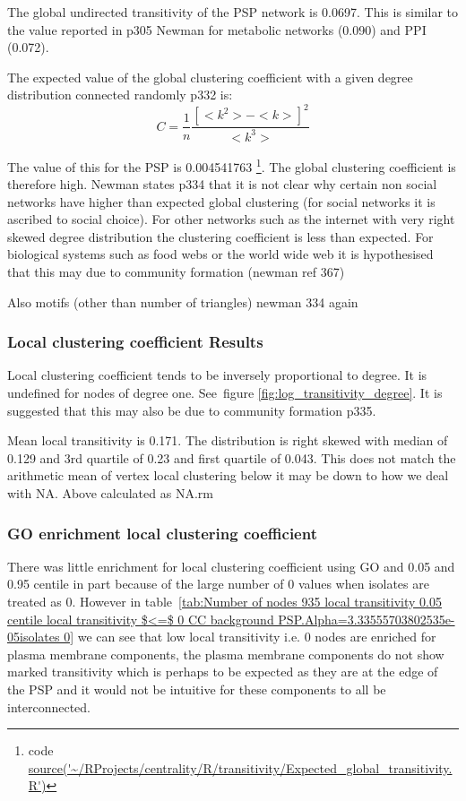 The global undirected transitivity of the PSP network is 0.0697. This is similar to the value reported in p305 Newman \cite{newman2018networks} for metabolic networks (0.090) and PPI (0.072).

The expected value of the global clustering coefficient with a given degree distribution connected randomly \cite{newman2018networks} p332 is:
\begin{equation}
    C=\frac{1}{n}\frac{[<k^2> - <k>]^2}{<k^3>}
\end{equation}

The value of this for the PSP is 0.004541763 \footnote{code \url{source('~/RProjects/centrality/R/transitivity/Expected_global_transitivity.R')}}. The global clustering coefficient is therefore high. Newman states p334 \cite{newman2018networks} that it is not clear why certain non social networks have higher than expected global clustering (for social networks it is ascribed to social choice). For other networks such as the internet with very right skewed degree distribution the clustering coefficient is less than expected. For biological systems such as food webs or the world wide web it is hypothesised that this may due to community formation (newman ref 367)

Also motifs (other than number of triangles) newman 334 again

\subsubsection{Local clustering coefficient Results}
Local clustering coefficient tends to be inversely proportional to degree. It is undefined for nodes of degree one. See~figure \ref{fig:log_transitivity_degree}. It is suggested that this may also be due to community formation \cite{newman2018networks} p335.

Mean local transitivity is 0.171. The distribution is right skewed with median of 0.129 and 3rd quartile of 0.23 and first quartile of 0.043. This does not match the arithmetic mean of vertex local clustering below it may be down to how we deal with NA. Above calculated as NA.rm
\subsubsection{GO enrichment local clustering coefficient}

There was little enrichment for local clustering coefficient using GO and 0.05 and 0.95 centile in part because of the large number of 0 values when isolates are treated as 0. However in table~\ref{tab:Number of nodes 935 local transitivity 0.05 centile  local transitivity $<=$ 0 CC background PSP.Alpha=3.33555703802535e-05isolates 0} we can see that low local transitivity i.e. 0 nodes are enriched for plasma membrane components, the plasma membrane components do not show marked transitivity which is perhaps to be expected as they are at the edge of the PSP and it would not be intuitive for these components to all be interconnected. 


